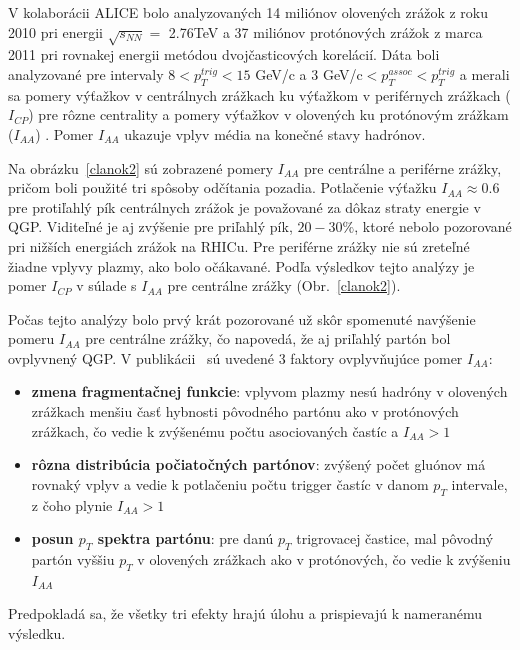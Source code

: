 \documentclass[thesismargins, thesislinespacing]{rnthesis}
\begin{document}
V kolaborácii ALICE bolo analyzovaných 14 miliónov olovených zrážok z roku 2010 pri energii $\sqrt{s_{NN}}=$ 2.76TeV a 37 miliónov protónových zrážok z marca 2011 pri rovnakej energii metódou dvojčasticových korelácií. Dáta boli analyzované pre intervaly $8<p^{trig}_{T}<15$ GeV/c a 3 GeV/c$<p^{assoc}_{T}<p_T^{trig}$ a merali sa pomery výťažkov v centrálnych zrážkach ku výťažkom v periférnych zrážkach ($I_{CP}$) pre rôzne centrality a pomery výťažkov v olovených ku protónovým zrážkam ($I_{AA}$) \cite{clanok}. Pomer $I_{AA}$ ukazuje vplyv média na konečné stavy hadrónov. 

Na obrázku~\ref{clanok2} sú zobrazené pomery $I_{AA}$ pre centrálne a periférne zrážky, pričom boli použité tri spôsoby odčítania pozadia. Potlačenie výťažku $I_{AA}\approx0.6$ pre protiľahlý pík centrálnych zrážok je považované za dôkaz straty energie v QGP. Viditeľné je aj zvýšenie pre priľahlý pík, $20-30\%$, ktoré nebolo pozorované pri nižších energiách zrážok na RHICu. Pre periférne zrážky nie sú zreteľné žiadne vplyvy plazmy, ako bolo očákavané. Podľa výsledkov tejto analýzy je pomer $I_{CP}$ v súlade s $I_{AA}$ pre centrálne zrážky (Obr.~\ref{clanok2}).



Počas tejto analýzy bolo prvý krát pozorované už skôr spomenuté navýšenie pomeru $I_{AA}$ pre centrálne zrážky, čo napovedá, že aj priľahlý partón bol ovplyvnený QGP. V publikácii~\cite{clanok} sú uvedené 3 faktory ovplyvňujúce pomer $I_{AA}$:
\begin{itemize}
	\item \textbf{zmena fragmentačnej funkcie}: vplyvom plazmy nesú hadróny v olovených zrážkach menšiu časť hybnosti pôvodného partónu ako v protónových zrážkach, čo vedie k zvýšenému počtu asociovaných častíc a $I_{AA}>1$
	\item \textbf{rôzna distribúcia počiatočných partónov}: zvýšený počet gluónov má rovnaký vplyv a vedie k potlačeniu počtu trigger častíc v danom $p_T$ intervale, z čoho plynie $I_{AA}>1$
	\item \textbf{posun $p_T$ spektra partónu}: pre danú $p_T$ trigrovacej častice, mal pôvodný partón vyššiu $p_T$ v olovených zrážkach ako v protónových, čo vedie k zvýšeniu $I_{AA}$
\end{itemize}

Predpokladá sa, že všetky tri efekty hrajú úlohu a prispievajú k nameranému výsledku.
\end{document}
